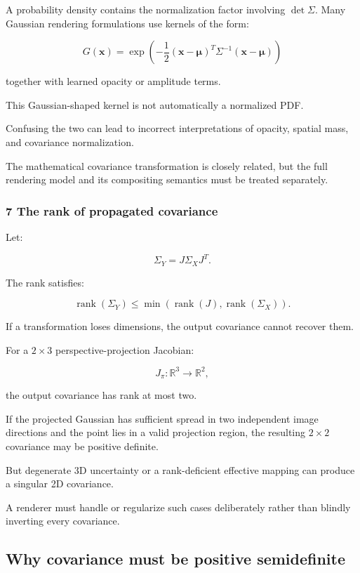 A probability density contains the normalization factor involving \(\det\Sigma\). Many Gaussian rendering formulations use kernels of the form:

\[
 G(\mathbf x)= \exp\left( -\frac12(\mathbf x-\boldsymbol\mu)^T \Sigma^{-1}(\mathbf x-\boldsymbol\mu) \right)
\]

together with learned opacity or amplitude terms.

This Gaussian-shaped kernel is not automatically a normalized PDF.

Confusing the two can lead to incorrect interpretations of opacity, spatial mass, and covariance normalization.

The mathematical covariance transformation is closely related, but the full rendering model and its compositing semantics must be treated separately.

\subsubsection{7 The rank of propagated covariance}\label{02-foundations-ii-ch024-the-rank-of-propagated-covariance}

Let:

\[
 \Sigma_Y=J\Sigma_XJ^T.
\]

The rank satisfies:

\[
 \operatorname{rank}(\Sigma_Y) \le \min(\operatorname{rank}(J),\operatorname{rank}(\Sigma_X)).
\]

If a transformation loses dimensions, the output covariance cannot recover them.

For a \(2\times3\) perspective-projection Jacobian:

\[
 J_\pi:\mathbb R^3\rightarrow\mathbb R^2,
\]

the output covariance has rank at most two.

If the projected Gaussian has sufficient spread in two independent image directions and the point lies in a valid projection region, the resulting \(2\times2\) covariance may be positive definite.

But degenerate 3D uncertainty or a rank-deficient effective mapping can produce a singular 2D covariance.

A renderer must handle or regularize such cases deliberately rather than blindly inverting every covariance.

\subsection{Why covariance must be positive semidefinite}\label{02-foundations-ii-ch024-why-covariance-must-be-positive-semidefinite}

